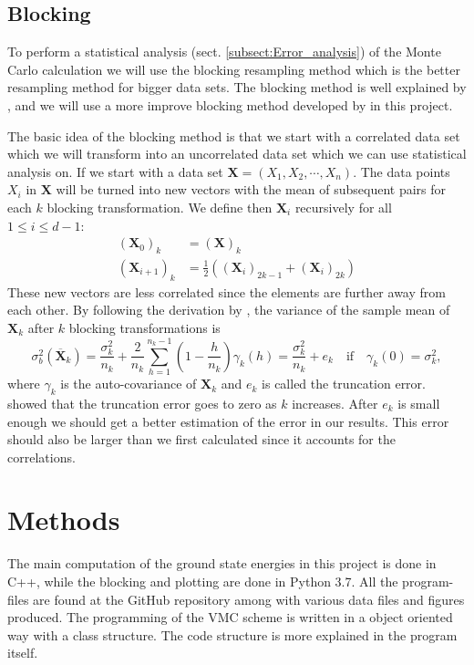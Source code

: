 \documentclass[12pt,a4paper,english]{article}
\begin{document}
\subsection{Blocking}
\label{subsect:Blocking}
To perform a statistical analysis (sect. \ref{subsect:Error_analysis}) of the Monte Carlo calculation we will use the blocking resampling method which is the better resampling method for bigger data sets. The blocking method is well explained by \citet{flyvbjerg1989error}, and we will use a more improve blocking method developed by \citet{jonsson2018standard} in this project. 

The basic idea of the blocking method is that we start with a correlated data set which we will transform into an uncorrelated data set which we can use statistical analysis on. If we start with a data set $\textbf{X}=(X_1,X_2,\cdots,X_n)$. The data points $X_i$ in $\textbf{X}$ will be turned into new vectors with the mean of subsequent pairs for each $k$ blocking transformation. We define then $\textbf{X}_i$ recursively for all $1\leq i \leq d-1$:
\begin{align*}
(\textbf{X}_0)_k&=(\textbf{X})_k\\
(\textbf{X}_{i+1})_k&=\frac{1}{2}\left((\textbf{X}_i)_{2k-1}+(\textbf{X}_i)_{2k}\right)
\end{align*}
These new vectors are less correlated since the elements are further away from each other. By following the derivation by \citet{jonsson2018standard}, the variance of the sample mean of $\textbf{X}_k$ after $k$ blocking transformations is
\begin{equation}
\label{eq:blocking_var}
\sigma^2_b(\overline{\textbf{X}}_k)=\frac{\sigma_k^2}{n_k}+\frac{2}{n_k}\sum_{h=1}^{n_k-1}\left(1-\frac{h}{n_k}\right)\gamma_k(h)=\frac{\sigma_k^2}{n_k}+e_k\quad \text{if}\quad \gamma_k(0)=\sigma_k^2,
\end{equation}
where $\gamma_k$ is the auto-covariance of $\textbf{X}_k$ and $e_k$ is called the truncation error. \citet{flyvbjerg1989error} showed that the truncation error goes to zero as $k$ increases. After $e_k$ is small enough we should get a better estimation of the error in our results. This error should also be larger than we first calculated since it accounts for the correlations.


\section{Methods}
\label{sect:Methods}
The main computation of the ground state energies in this project is done in C++, while the blocking and plotting are done in Python 3.7. All the program-files are found at the GitHub repository \cite{GitHub} among with various data files and figures produced. The programming of the VMC scheme is written in a object oriented way with a class structure. The code structure is more explained in the program itself.
\end{document}
